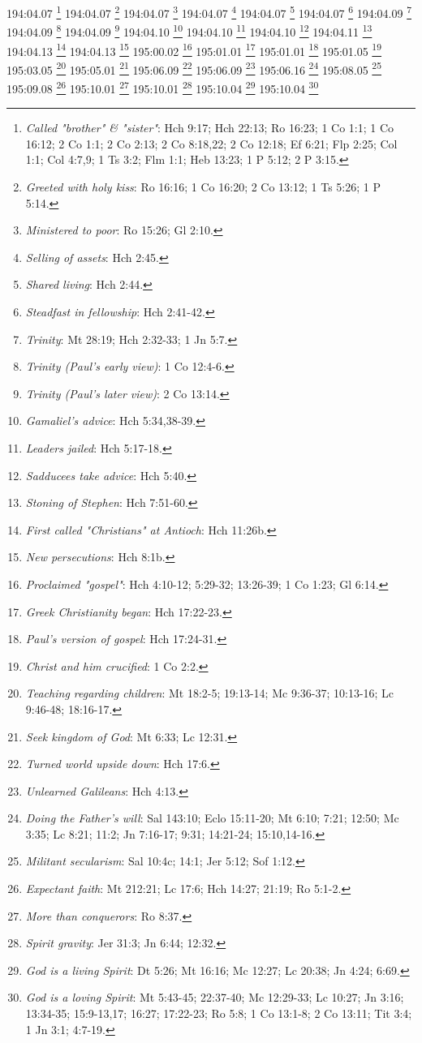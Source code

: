 194:04.07 \footnote{\textit{Called "brother" & "sister"}: Hch 9:17; Hch 22:13; Ro 16:23; 1 Co 1:1; 1 Co 16:12; 2 Co 1:1; 2 Co 2:13; 2 Co 8:18,22; 2 Co 12:18; Ef 6:21; Flp 2:25; Col 1:1; Col 4:7,9; 1 Ts 3:2; Flm 1:1; Heb 13:23; 1 P 5:12; 2 P 3:15.}
194:04.07 \footnote{\textit{Greeted with holy kiss}: Ro 16:16; 1 Co 16:20; 2 Co 13:12; 1 Ts 5:26; 1 P 5:14.}
194:04.07 \footnote{\textit{Ministered to poor}: Ro 15:26; Gl 2:10.}
194:04.07 \footnote{\textit{Selling of assets}: Hch 2:45.}
194:04.07 \footnote{\textit{Shared living}: Hch 2:44.}
194:04.07 \footnote{\textit{Steadfast in fellowship}: Hch 2:41-42.}
194:04.09 \footnote{\textit{Trinity}: Mt 28:19; Hch 2:32-33; 1 Jn 5:7.}
194:04.09 \footnote{\textit{Trinity (Paul's early view)}: 1 Co 12:4-6.}
194:04.09 \footnote{\textit{Trinity (Paul's later view)}: 2 Co 13:14.}
194:04.10 \footnote{\textit{Gamaliel's advice}: Hch 5:34,38-39.}
194:04.10 \footnote{\textit{Leaders jailed}: Hch 5:17-18.}
194:04.10 \footnote{\textit{Sadducees take advice}: Hch 5:40.}
194:04.11 \footnote{\textit{Stoning of Stephen}: Hch 7:51-60.}
194:04.13 \footnote{\textit{First called "Christians" at Antioch}: Hch 11:26b.}
194:04.13 \footnote{\textit{New persecutions}: Hch 8:1b.}
195:00.02 \footnote{\textit{Proclaimed "gospel"}: Hch 4:10-12; 5:29-32; 13:26-39; 1 Co 1:23; Gl 6:14.}
195:01.01 \footnote{\textit{Greek Christianity began}: Hch 17:22-23.}
195:01.01 \footnote{\textit{Paul's version of gospel}: Hch 17:24-31.}
195:01.05 \footnote{\textit{Christ and him crucified}: 1 Co 2:2.}
195:03.05 \footnote{\textit{Teaching regarding children}: Mt 18:2-5; 19:13-14; Mc 9:36-37; 10:13-16; Lc 9:46-48; 18:16-17.}
195:05.01 \footnote{\textit{Seek kingdom of God}: Mt 6:33; Lc 12:31.}
195:06.09 \footnote{\textit{Turned world upside down}: Hch 17:6.}
195:06.09 \footnote{\textit{Unlearned Galileans}: Hch 4:13.}
195:06.16 \footnote{\textit{Doing the Father's will}: Sal 143:10; Eclo 15:11-20; Mt 6:10; 7:21; 12:50; Mc 3:35; Lc 8:21; 11:2; Jn 7:16-17; 9:31; 14:21-24; 15:10,14-16.}
195:08.05 \footnote{\textit{Militant secularism}: Sal 10:4c; 14:1; Jer 5:12; Sof 1:12.}
195:09.08 \footnote{\textit{Expectant faith}: Mt 212:21; Lc 17:6; Hch 14:27; 21:19; Ro 5:1-2.}
195:10.01 \footnote{\textit{More than conquerors}: Ro 8:37.}
195:10.01 \footnote{\textit{Spirit gravity}: Jer 31:3; Jn 6:44; 12:32.}
195:10.04 \footnote{\textit{God is a living Spirit}: Dt 5:26; Mt 16:16; Mc 12:27; Lc 20:38; Jn 4:24; 6:69.}
195:10.04 \footnote{\textit{God is a loving Spirit}: Mt 5:43-45; 22:37-40; Mc 12:29-33; Lc 10:27; Jn 3:16; 13:34-35; 15:9-13,17; 16:27; 17:22-23; Ro 5:8; 1 Co 13:1-8; 2 Co 13:11; Tit 3:4; 1 Jn 3:1; 4:7-19.}
